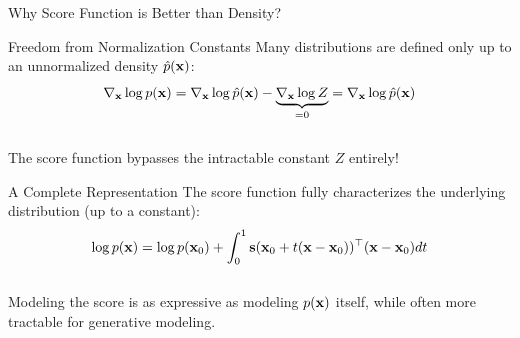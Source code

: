 \documentclass{beamer}
\renewcommand{\eqpause}{}
\begin{document}
\begin{frame}{Why Score Function is Better than Density?}
	\begin{block}{Freedom from Normalization Constants}
		Many distributions are defined only up to an unnormalized density $\hat{p}(\mathbf{x})$:
		\vspace{-0.3cm}
		\[
			\nabla_{\mathbf{x}} \log p(\mathbf{x}) = \nabla_{\mathbf{x}} \log \hat{p}(\mathbf{x}) - \underbrace{\nabla_{\mathbf{x}} \log Z}_{=0} = \nabla_{\mathbf{x}} \log \hat{p}(\mathbf{x})
		\]
		\vspace{-0.3cm} \\
		The score function bypasses the intractable constant $Z$ entirely!
	\end{block}
	\eqpause
	\begin{block}{A Complete Representation}
		The score function fully characterizes the underlying distribution (up to a constant):
		\vspace{-0.2cm}
		\[
			\log p(\mathbf{x}) = \log p(\mathbf{x}_0) + \int_0^1 \mathbf{s}(\mathbf{x}_0 + t(\mathbf{x} - \mathbf{x}_0))^\top (\mathbf{x} - \mathbf{x}_0) dt
		\]
		\vspace{-0.5cm} \\
		Modeling the score is as expressive as modeling $p(\mathbf{x})$ itself, while often more tractable for generative modeling.
	\end{block}
\end{frame}
\end{document}
